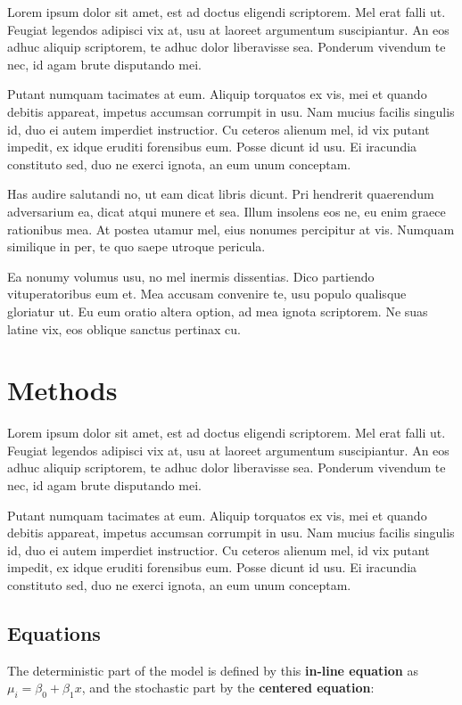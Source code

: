 \documentclass[]{article}
\begin{document}
Lorem ipsum dolor sit amet, est ad doctus eligendi scriptorem. Mel erat
falli ut. Feugiat legendos adipisci vix at, usu at laoreet argumentum
suscipiantur. An eos adhuc aliquip scriptorem, te adhuc dolor
liberavisse sea. Ponderum vivendum te nec, id agam brute disputando mei.

Putant numquam tacimates at eum. Aliquip torquatos ex vis, mei et quando
debitis appareat, impetus accumsan corrumpit in usu. Nam mucius facilis
singulis id, duo ei autem imperdiet instructior. Cu ceteros alienum mel,
id vix putant impedit, ex idque eruditi forensibus eum. Posse dicunt id
usu. Ei iracundia constituto sed, duo ne exerci ignota, an eum unum
conceptam.

Has audire salutandi no, ut eam dicat libris dicunt. Pri hendrerit
quaerendum adversarium ea, dicat atqui munere et sea. Illum insolens eos
ne, eu enim graece rationibus mea. At postea utamur mel, eius nonumes
percipitur at vis. Numquam similique in per, te quo saepe utroque
pericula.

Ea nonumy volumus usu, no mel inermis dissentias. Dico partiendo
vituperatoribus eum et. Mea accusam convenire te, usu populo qualisque
gloriatur ut. Eu eum oratio altera option, ad mea ignota scriptorem. Ne
suas latine vix, eos oblique sanctus pertinax cu.

\section{Methods}\label{methods}

Lorem ipsum dolor sit amet, est ad doctus eligendi scriptorem. Mel erat
falli ut. Feugiat legendos adipisci vix at, usu at laoreet argumentum
suscipiantur. An eos adhuc aliquip scriptorem, te adhuc dolor
liberavisse sea. Ponderum vivendum te nec, id agam brute disputando mei.

Putant numquam tacimates at eum. Aliquip torquatos ex vis, mei et quando
debitis appareat, impetus accumsan corrumpit in usu. Nam mucius facilis
singulis id, duo ei autem imperdiet instructior. Cu ceteros alienum mel,
id vix putant impedit, ex idque eruditi forensibus eum. Posse dicunt id
usu. Ei iracundia constituto sed, duo ne exerci ignota, an eum unum
conceptam.

\subsection{Equations}\label{equations}

The deterministic part of the model is defined by this \textbf{in-line
equation} as $\mu_i = \beta_0 + \beta_1x$, and the stochastic part by
the \textbf{centered equation}:
\end{document}
